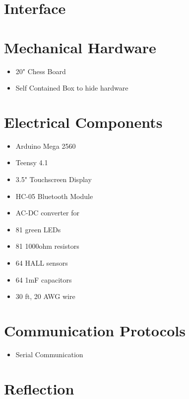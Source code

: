 \documentclass[12pt, titlepage]{article}
\begin{document}
% 

\newpage{}

\appendix

\section{Interface}


\section{Mechanical Hardware}
\begin{itemize}
  \item 20" Chess Board
  \item Self Contained Box to hide hardware
\end{itemize}

\section{Electrical Components}
\begin{itemize}
  \item Arduino Mega 2560
  \item Teensy 4.1 
  \item 3.5" Touchscreen Display
  \item HC-05 Bluetooth Module
  \item AC-DC converter for 
  \item 81 green LEDs
  \item 81 1000ohm resistors
  \item 64 HALL sensors
  \item 64 1mF capacitors
  \item 30 ft, 20 AWG wire
\end{itemize}

\section{Communication Protocols}
\begin{itemize}
  \item Serial Communication
\end{itemize}

\section{Reflection}
\end{document}
